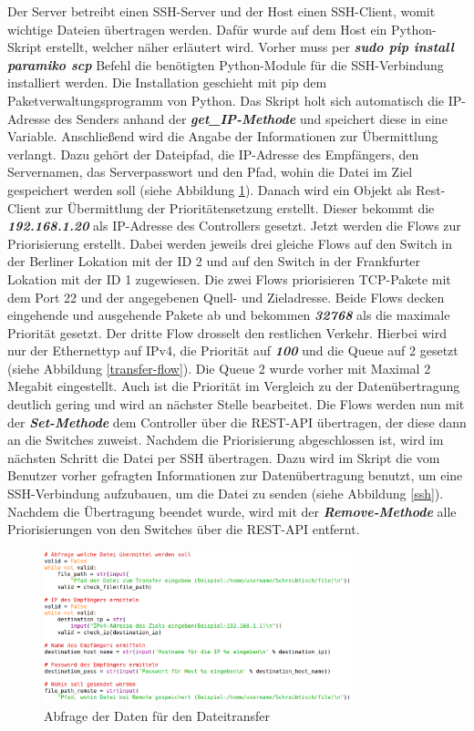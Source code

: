 \documentclass[fontsize=12pt,paper=a4,open=any,parskip=half,
  twoside=false,toc=listof,toc=bibliography,fleqn,leqno,
  captions=nooneline,captions=tableabove,british]{scrbook}
\begin{document}
Der Server betreibt einen SSH-Server und der Host einen SSH-Client, womit wichtige Dateien übertragen werden. Dafür wurde auf dem Host ein Python-Skript erstellt, welcher näher erläutert wird. Vorher muss per \textit{\textbf{sudo pip install paramiko scp}} Befehl die benötigten Python-Module für die SSH-Verbindung installiert werden. Die Installation geschieht mit pip dem Paketverwaltungsprogramm von Python. Das Skript holt sich automatisch die IP-Adresse des Senders anhand der \textit{\textbf{get\_IP-Methode}} und speichert diese in eine Variable. Anschließend wird die Angabe der Informationen zur Übermittlung verlangt. Dazu gehört der Dateipfad, die IP-Adresse des Empfängers, den Servernamen, das Serverpasswort und den Pfad, wohin die Datei im Ziel gespeichert werden soll (siehe Abbildung \ref{transfer-daten}). Danach wird ein Objekt als Rest-Client zur Übermittlung der Prioritätensetzung erstellt. Dieser bekommt die \textit{\textbf{192.168.1.20}} als IP-Adresse des Controllers gesetzt. Jetzt werden die Flows zur Priorisierung erstellt. Dabei werden jeweils drei gleiche Flows auf den Switch in der Berliner Lokation mit der ID 2 und auf den Switch in der Frankfurter Lokation mit der ID 1 zugewiesen. Die zwei Flows priorisieren TCP-Pakete mit dem Port 22 und der angegebenen Quell- und Zieladresse. Beide Flows decken eingehende und ausgehende Pakete ab und bekommen \textit{\textbf{32768}} als die maximale Priorität gesetzt. Der dritte Flow drosselt den restlichen Verkehr. Hierbei wird nur der Ethernettyp auf IPv4, die Priorität auf \textit{\textbf{100}} und die Queue auf 2 gesetzt (siehe Abbildung \ref{transfer-flow}). Die Queue 2 wurde vorher mit Maximal 2 Megabit eingestellt. Auch ist die Priorität im Vergleich zu der Datenübertragung deutlich gering und wird an nächster Stelle bearbeitet. Die Flows werden nun mit der \textit{\textbf{Set-Methode}} dem Controller über die REST-API übertragen, der diese dann an die Switches zuweist. Nachdem die Priorisierung abgeschlossen ist, wird im nächsten Schritt die Datei per SSH übertragen. Dazu wird im Skript die vom Benutzer vorher gefragten Informationen zur Datenübertragung benutzt, um eine SSH-Verbindung aufzubauen, um die Datei zu senden (siehe Abbildung \ref{ssh}). Nachdem die Übertragung beendet wurde, wird mit der \textit{\textbf{Remove-Methode}} alle Priorisierungen von den Switches über die REST-API entfernt.

\begin{figure}[H]
 \centering
 \includegraphics[width=0.8\textwidth]{Bilder/transfer-daten}
 \captionsetup{justification=centering}
 \caption{Abfrage der Daten für den Dateitransfer}
 \label{transfer-daten}
\end{figure}
\end{document}
